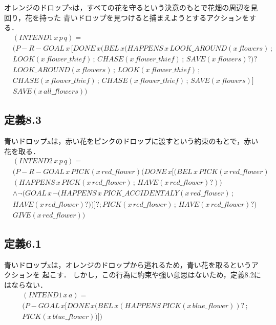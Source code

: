 \documentclass[a4]{jsarticle}
\begin{document}
オレンジのドロップxは，すべての花を守るという決意のもとで花畑の周辺を見回り，花を持った
青いドロップを見つけると捕まえようとするアクションをする．
\begin{align*}
	&(INTEND1 \, x \, p \, q) = \\
	&(P-R-GOAL \, x \, [DONE \, x (BEL \, x (HAPPENS \, x \, LOOK\_AROUND(x \, flowers) \, ; \\
	&LOOK(x \, flower\_thief) \, ; \, CHASE(x \, flower\_thief) \, ; \, SAVE(x \, flowers)?)? \\
	&LOOK\_AROUND(x \, flowers) \, ; \, LOOK(x \, flower\_thief) \, ; \, \\
	&CHASE(x \, flower\_thief) \, ; \, CHASE(x \, flower\_thief) \, ; \, SAVE(x \, flowers)] \\
	&SAVE(x \, all\_flowers))
\end{align*}

\subsection{定義8.3}
青いドロップxは，赤い花をピンクのドロップに渡すという約束のもとで，赤い花を取る．
\begin{align*}
	&(INTEND2 \, x \, p \, q) = \\
	&(P-R-GOAL \, x \, PICK(x \, red\_flower) (DONE \, x [(BEL \, x \, PICK(x \, red\_flower) \\
	&(HAPPENS \, x \, PICK(x \, red\_flower) \, ; \, HAVE(x \, red\_flower)?)) \\
	&\land \neg (GOAL \, x \, \neg(HAPPENS \, x \, PICK\_ACCIDENTALY(x \, red\_flower) \, ; \\
	&HAVE(x \, red\_flower)?))]? ; PICK(x \, red\_flower) \, ; \, HAVE(x \, red\_flower)?) \\
	&GIVE(x \, red\_flower))
\end{align*}

\subsection{定義6.1}
青いドロップxは，オレンジのドロップから逃れるため，青い花を取るというアクションを
起こす．
しかし，この行為に約束や強い意思はないため，定義8.2にはならない．
\begin{align*}
	&(INTEND1 \, x \, a) = \\
	&(P-GOAL \, x [DONE \, x (BEL \, x (HAPPENS \, PICK(x \, blue\_flower))? \, ; \, \\
	&PICK(x \, blue\_flower))])
\end{align*}
\end{document}
